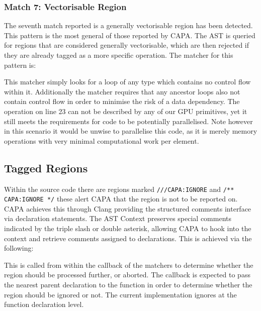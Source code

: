 \pagebreak

\subsubsection{Match 7: Vectorisable Region}
The seventh match reported is a generally vectorisable region has been detected. This pattern is the
most general of those reported by CAPA. The AST is queried for regions that are considered generally
vectorisable, which are then rejected if they are already tagged as a more specific operation. The
matcher for this pattern is:

This matcher simply looks for a loop of any type which contains no control flow within it.
Additionally the matcher requires that any ancestor loops also not contain control flow in order to
minimise the risk of a data dependency. The operation on line 23 can not be described by any of our
GPU primitives, yet it still meets the requirements for code to be potentially parallelised. Note
however in this scenario it would be unwise to parallelise this code, as it is merely memory
operations with very minimal computational work per element.

\subsection{Tagged Regions}\label{TaggedRegion}
Within the source code there are regions marked \lstinline{///CAPA:IGNORE} and
\lstinline{/** CAPA:IGNORE */} these alert CAPA that the region is not to be reported on. CAPA
achieves this through Clang providing the structured comments interface via declaration statements.
The AST Context preserves special comments indicated by the triple slash or double asterisk,
allowing CAPA to hook into the context and retrieve comments assigned to declarations. This is
achieved via the following:

This is called from within the callback of the matchers to determine whether the region should be
processed further, or aborted. The callback is expected to pass the nearest parent declaration to
the function in order to determine whether the region should be ignored or not. The current
implementation ignores at the function declaration level.

